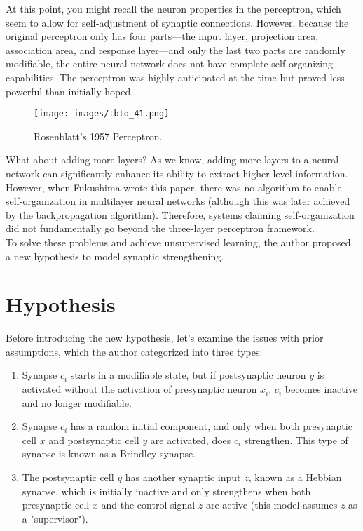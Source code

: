 \documentclass[11p,oneside]{book}
\begin{document}
At this point, you might recall the neuron properties in the perceptron, which seem to allow for self-adjustment of synaptic connections. However, because the original perceptron only has four parts—the input layer, projection area, association area, and response layer—and only the last two parts are randomly modifiable, the entire neural network does not have complete self-organizing capabilities. The perceptron was highly anticipated at the time but proved less powerful than initially hoped.

\begin{figure}[H]
    \centering
    \texttt{[image: images/tbto\_41.png]}
    \caption{Rosenblatt's 1957 Perceptron.}
\end{figure}

What about adding more layers? As we know, adding more layers to a neural network can significantly enhance its ability to extract higher-level information. However, when Fukushima wrote this paper, there was no algorithm to enable self-organization in multilayer neural networks (although this was later achieved by the backpropagation algorithm). Therefore, systems claiming self-organization did not fundamentally go beyond the three-layer perceptron framework.
\\

To solve these problems and achieve unsupervised learning, the author proposed a new hypothesis to model synaptic strengthening.

\section*{Hypothesis}

Before introducing the new hypothesis, let’s examine the issues with prior assumptions, which the author categorized into three types:

\begin{enumerate}
    \item Synapse $c_i$ starts in a modifiable state, but if postsynaptic neuron $y$ is activated without the activation of presynaptic neuron $x_i$, $c_i$ becomes inactive and no longer modifiable.
    \item Synapse $c_i$ has a random initial component, and only when both presynaptic cell $x$ and postsynaptic cell $y$ are activated, does $c_i$ strengthen. This type of synapse is known as a Brindley synapse.
    \item The postsynaptic cell $y$ has another synaptic input $z$, known as a Hebbian synapse, which is initially inactive and only strengthens when both presynaptic cell $x$ and the control signal $z$ are active (this model assumes $z$ as a "supervisor").
\end{enumerate}
\end{document}
